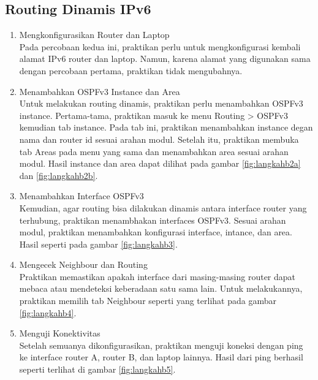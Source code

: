\subsection{Routing Dinamis IPv6}
\begin{enumerate}
  \item Mengkonfigurasikan Router dan Laptop \\
  Pada percobaan kedua ini, praktikan perlu untuk mengkonfigurasi kembali alamat IPv6 router dan laptop. Namun, karena alamat yang digunakan sama dengan percobaan pertama, praktikan tidak mengubahnya.
  \item Menambahkan OSPFv3 Instance dan Area \\
  Untuk melakukan routing dinamis, praktikan perlu menambahkan OSPFv3 instance. Pertama-tama, praktikan masuk ke menu Routing > OSPFv3 kemudian tab instance. Pada tab ini, praktikan menambahkan instance degan nama dan router id sesuai arahan modul. Setelah itu, praktikan membuka tab Areas pada menu yang sama dan menambahkan area sesuai arahan modul. Hasil instance dan area dapat dilihat pada gambar \ref{fig:langkahb2a} dan \ref{fig:langkahb2b}.
  \item Menambahkan Interface OSPFv3 \\
  Kemudian, agar routing bisa dilakukan dinamis antara interface router yang terhubung, praktikan menambhakan interfaces OSPFv3. Sesuai arahan modul, praktikan menambahkan konfigurasi interface, intance, dan area. Hasil seperti pada gambar \ref{fig:langkahb3}.
  \item Mengecek Neighbour dan Routing \\
  Praktikan memastikan apakah interface dari masing-masing router dapat mebaca atau mendeteksi keberadaan satu sama lain. Untuk melakukannya, praktikan memilih tab Neighbour seperti yang terlihat pada gambar \ref{fig:langkahb4}.
  \item Menguji Konektivitas \\
  Setelah semuanya dikonfigurasikan, praktikan menguji koneksi dengan ping ke interface router A, router B, dan laptop lainnya. Hasil dari ping berhasil seperti terlihat di gambar \ref{fig:langkahb5}.
\end{enumerate}

